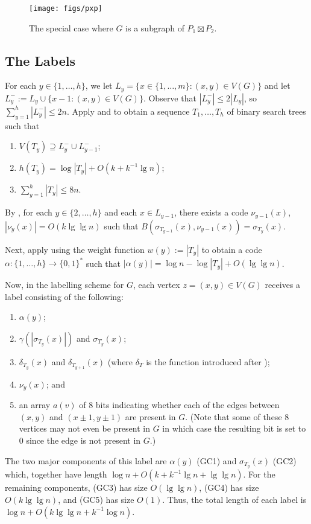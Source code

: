 \documentclass[kpfonts]{patmorin}
\let\le\leqslant
\begin{document}
\begin{figure}
  \begin{center}
    \texttt{[image: figs/pxp]}
  \end{center}
  \caption{The special case where $G$ is a subgraph of $P_1\boxtimes P_2$.}
\end{figure}


\subsection{The Labels}

For each $y\in\{1,\ldots,h\}$, we let $L_y=\{x\in\{1,\ldots,m\}:(x,y)\in V(G)\}$ and let $L^-_y:=L_y\cup\{x-1:(x,y)\in V(G)\}$.  Observe that $|L^-_y|\le 2|L_y|$, so $\sum_{y=1}^h |L^-_y|\le 2n$.   Apply  and  to obtain a sequence $T_1,\ldots,T_h$ of binary search trees such that

\begin{enumerate}[(PR1)]
  \item $V(T_y)\supseteq L^-_{y}\cup L^-_{y-1}$;
  \item $h(T_y)=\log|T_y| + O(k+k^{-1}\lg n)$;
  \item $\sum_{y=1}^h|T_y| \le 8n$.
\end{enumerate}

By , for each $y\in\{2,\ldots,h\}$ and each $x\in L_{y-1}$, there exists a code $\nu_{y-1}(x)$, $|\nu_y(x)|=O(k\lg\lg n)$ such that $B(\sigma_{T_{y-1}}(x),\nu_{y-1}(x))=\sigma_{T_y}(x)$.

Next, apply  using the weight function $w(y):=|T_y|$ to obtain a code $\alpha:\{1,\ldots,h\}\to \{0,1\}^*$ such that $|\alpha(y)|=\log n - \log|T_y| + O(\lg\lg n)$.

Now, in the labelling scheme for $G$, each vertex $z=(x,y)\in V(G)$ receives a label consisting of the following:  
\begin{enumerate}[(GC1)]
  \item $\alpha(y)$;
  \item $\gamma(|\sigma_{T_y}(x)|)$ and $\sigma_{T_y}(x)$;
  \item $\delta_{T_y}(x)$ and $\delta_{T_{y+1}}(x)$ (where $\delta_T$ is the function  introduced after );
  \item $\nu_y(x)$; and
  \item an array $a(v)$ of $8$ bits indicating whether each of the edges between $(x,y)$ and $(x\pm 1,y\pm 1)$ are present in $G$.  (Note that some of these 8 vertices may not even be present in $G$ in which case the resulting bit is set to 0 since the edge is not present in $G$.)
\end{enumerate}
The two major components of this label are $\alpha(y)$ (GC1) and $\sigma_{T_y}(x)$ (GC2) which, together have length $\log n + O(k+k^{-1}\lg n+\lg\lg n)$. For the remaining components, (GC3) has size $O(\lg\lg n)$, (GC4) has size $O(k\lg\lg n)$, and (GC5) has size $O(1)$.  Thus, the total length of each label is $\log n+ O(k\lg\lg n + k^{-1}\log n)$.  
\end{document}
